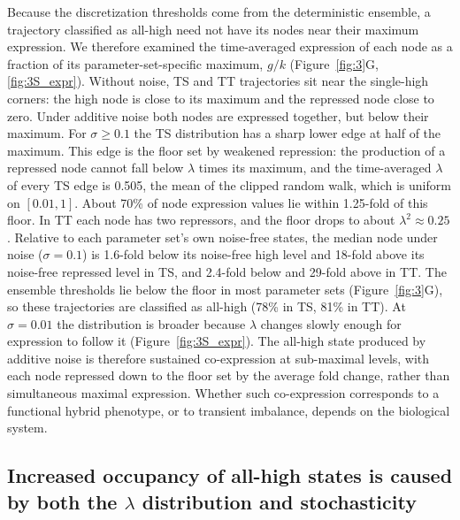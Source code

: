 \documentclass[11pt]{article}
\providecommand{\DIFaddtex}[1]{{\protect\color{red}#1}} %
\providecommand{\DIFaddbegin}{} %
\providecommand{\DIFaddend}{} %
\providecommand{\DIFdelbegin}{} %
\providecommand{\DIFdelend}{} %
\providecommand{\DIFadd}[1]{\texorpdfstring{\DIFaddtex{#1}}{#1}} %
\providecommand{\DIFaddincludegraphics}[2][]{\DIFOincludegraphics[#1]{#2}} %
\providecommand{\DIFdelincludegraphics}[2][]{}
\DeclareRobustCommand{\DIFaddbegin}{\DIFOaddbegin \let\includegraphics\DIFaddincludegraphics} %
\DeclareRobustCommand{\DIFaddend}{\DIFOaddend \let\includegraphics\DIFOincludegraphics} %
\DeclareRobustCommand{\DIFdelbegin}{\DIFOdelbegin \let\includegraphics\DIFdelincludegraphics} %
\DeclareRobustCommand{\DIFdelend}{\DIFOaddend \let\includegraphics\DIFOincludegraphics} %
\begin{document}
\DIFdelbegin \DIFdelend %
\DIFaddbegin \DIFadd{Because the discretization thresholds come from the deterministic ensemble, a trajectory classified as all-high need not have its nodes near their maximum expression. We therefore examined the time-averaged expression of each node as a fraction of its parameter-set-specific maximum, $g/k$ (Figure~\ref{fig:3}G, \ref{fig:3S_expr}). Without noise, TS and TT trajectories sit near the single-high corners: the high node is close to its maximum and the repressed node close to zero. Under additive noise both nodes are expressed together, but below their maximum. For $\sigma \geq 0.1$ the TS distribution has a sharp lower edge at half of the maximum. This edge is the floor set by weakened repression: the production of a repressed node cannot fall below $\lambda$ times its maximum, and the time-averaged $\lambda$ of every TS edge is 0.505, the mean of the clipped random walk, which is uniform on $[0.01, 1]$. About 70\% of node expression values lie within 1.25-fold of this floor. In TT each node has two repressors, and the floor drops to about $\lambda^2 \approx 0.25$. Relative to each parameter set's own noise-free states, the median node under noise ($\sigma = 0.1$) is 1.6-fold below its noise-free high level and 18-fold above its noise-free repressed level in TS, and 2.4-fold below and 29-fold above in TT. The ensemble thresholds lie below the floor in most parameter sets (Figure~\ref{fig:3}G), so these trajectories are classified as all-high (78\% in TS, 81\% in TT). At $\sigma = 0.01$ the distribution is broader because $\lambda$ changes slowly enough for expression to follow it (Figure~\ref{fig:3S_expr}). The all-high state produced by additive noise is therefore sustained co-expression at sub-maximal levels, with each node repressed down to the floor set by the average fold change, rather than simultaneous maximal expression. Whether such co-expression corresponds to a functional hybrid phenotype, or to transient imbalance, depends on the biological system.
}\DIFaddend 

\DIFaddbegin \subsection{\DIFadd{Increased occupancy of all-high states is caused by both the $\lambda$ distribution and stochasticity}}
\end{document}
